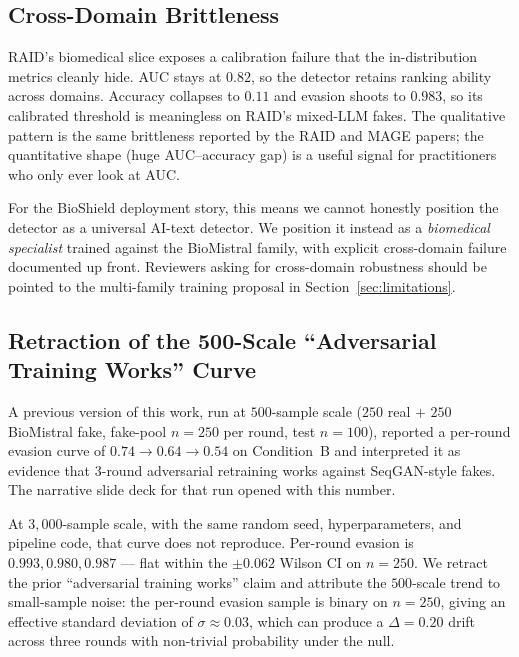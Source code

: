 \documentclass[conference]{IEEEtran}
\begin{document}
\subsection{Cross-Domain Brittleness}
\label{ssec:domain_disc}

RAID's biomedical slice exposes a calibration failure that the
in-distribution metrics cleanly hide. AUC stays at \(0.82\), so the
detector retains ranking ability across domains. Accuracy collapses to
\(0.11\) and evasion shoots to \(0.983\), so its calibrated threshold
is meaningless on RAID's mixed-LLM fakes. The qualitative pattern is
the same brittleness reported by the RAID and MAGE papers; the
quantitative shape (huge AUC--accuracy gap) is a useful signal for
practitioners who only ever look at AUC.

For the BioShield deployment story, this means we cannot honestly
position the detector as a universal AI-text detector. We position it
instead as a \emph{biomedical specialist} trained against the
BioMistral family, with explicit cross-domain failure documented up
front. Reviewers asking for cross-domain robustness should be pointed
to the multi-family training proposal in Section~\ref{sec:limitations}.

\subsection{Retraction of the 500-Scale ``Adversarial Training Works''
Curve}
\label{ssec:retraction}

A previous version of this work, run at \(500\)-sample scale
(\(250\) real \(+\) \(250\) BioMistral fake, fake-pool
\(n = 250\) per round, test \(n = 100\)), reported a per-round
evasion curve of \(0.74 \to 0.64 \to 0.54\) on Condition~B and
interpreted it as evidence that 3-round adversarial retraining works
against SeqGAN-style fakes. The narrative slide deck for that run
opened with this number.

At \(3{,}000\)-sample scale, with the same
random seed, hyperparameters, and pipeline code, that curve does not
reproduce. Per-round evasion is \(0.993, 0.980, 0.987\) — flat within
the \(\pm 0.062\) Wilson CI on \(n = 250\). We retract the prior
``adversarial training works'' claim and attribute the \(500\)-scale
trend to small-sample noise: the per-round evasion sample is binary on
\(n = 250\), giving an effective standard deviation of
\(\sigma \approx 0.03\), which can produce a \(\Delta = 0.20\) drift
across three rounds with non-trivial probability under the null.
\end{document}
